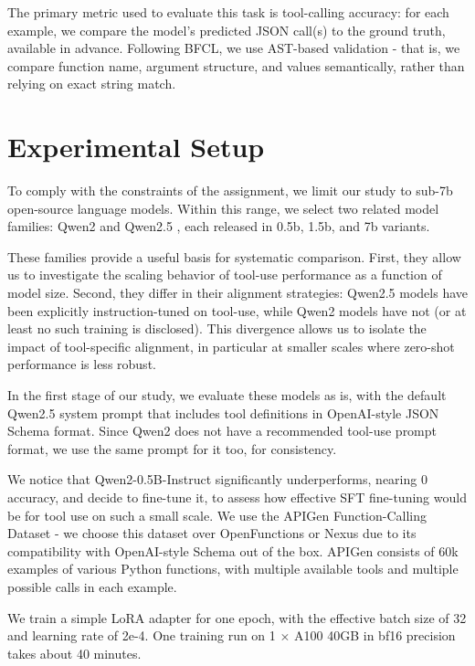 \documentclass[12pt]{extarticle}
\begin{document}
The primary metric used to evaluate this task is tool-calling accuracy: for each example, we compare the model's predicted JSON call(s) to the ground truth, available in advance. Following BFCL, we use AST-based validation - that is, we compare function name, argument structure, and values semantically, rather than relying on exact string match.

\section{Experimental Setup}

To comply with the constraints of the assignment, we limit our study to sub-7b open-source language models. Within this range, we select two related model families: Qwen2 \cite{qwen2} and Qwen2.5 \cite{qwen25}, each released in 0.5b, 1.5b, and 7b variants.

These families provide a useful basis for systematic comparison. First, they allow us to investigate the scaling behavior of tool-use performance as a function of model size. Second, they differ in their alignment strategies: Qwen2.5 models have been explicitly instruction-tuned on tool-use, while Qwen2 models have not (or at least no such training is disclosed). This divergence allows us to isolate the impact of tool-specific alignment, in particular at smaller scales where zero-shot performance is less robust.

In the first stage of our study, we evaluate these models as is, with the default Qwen2.5 system prompt that includes tool definitions in OpenAI-style JSON Schema format. Since Qwen2 does not have a recommended tool-use prompt format, we use the same prompt for it too, for consistency.

We notice that Qwen2-0.5B-Instruct significantly underperforms, nearing 0 accuracy, and decide to fine-tune it, to assess how effective SFT fine-tuning would be for tool use on such a small scale. We use the APIGen Function-Calling Dataset \cite{apigen} - we choose this dataset over OpenFunctions \cite{gorilla} or Nexus \cite{nexus} due to its compatibility with OpenAI-style Schema out of the box. APIGen consists of 60k examples of various Python functions, with multiple available tools and multiple possible calls in each example.

We train a simple LoRA adapter \cite{lora} for one epoch, with the effective batch size of 32 and learning rate of 2e-4. One training run on 1 $\times$ A100 40GB in bf16 precision takes about 40 minutes.
\end{document}
